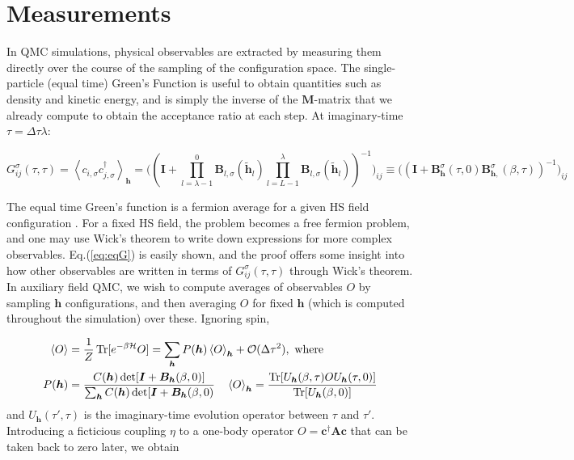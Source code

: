 \section{Measurements}
\label{subsec:measurements}

In QMC simulations, physical observables are extracted by measuring them directly over the course of the sampling of the  configuration space. The single-particle (equal time) Green's Function is useful to obtain quantities such as density and kinetic energy, and is simply the inverse of the $\bm M$-matrix that we already compute to obtain the acceptance ratio at each step.
At imaginary-time $\tau = \Delta \tau \lambda$: 

\begin{equation}\label{eq:eqG}
G_{ij}^\sigma ( \tau, \tau) = \left\langle c_{i,\sigma} c_{j,\sigma}^\dagger \right\rangle_{\bm h} = \bigg( (\bm I + \prod_{l= \lambda - 1}^0 \bm B_{l,\sigma} ( \widetilde{\bm h}_l ) \prod_{l= L -1}^\lambda \bm B_{l,\sigma} ( \widetilde{\bm h}_l )  )^{-1} \bigg)_{ij} \equiv \bigg( (\bm I + \bm B_{\bm h}^\sigma (\tau, 0) \bm B_{\bm h, }^\sigma (\beta, \tau)  )^{-1} \bigg)_{ij}
\end{equation}

The equal time Green's function is a fermion average for a given HS field configuration \cite{santos_introduction_2003}.
For a fixed HS field, the problem becomes a free fermion problem, and one may use Wick's theorem to write down expressions for more complex observables.
Eq.(\ref{eq:eqG}) is easily shown, and the proof offers some insight into how other observables are written in terms of $G_{ij}^\sigma (\tau, \tau)$ through Wick's theorem.
In auxiliary field \ac{QMC}, we wish to compute averages of observables $O$ by sampling $\bm h$ configurations, and then averaging $O$ for fixed $\bm h$ (which is computed throughout the simulation) over these.
Ignoring spin,

\begin{equation}
\begin{split}
\left\langle O \right\rangle &= \frac{1}{Z} \operatorname{Tr} [ e^{-\beta \mathcal{H} } O ] = \sum_{\bm h} P (\bm h) \left\langle O \right\rangle_{\bm h} + \mathcal{O}(\Delta \tau^2 ) , \,\,
\text{where} \\
P ( \bm h ) &= \frac{C(\bm h) \det [ \bm I + \bm B_{\bm h} ( \beta, 0 ) ] }{\sum_{\bm h} C(\bm h) \det [ \bm I + \bm B_{\bm h} ( \beta, 0 )} \quad
\left\langle O \right\rangle_{\bm h} = \frac{\operatorname{Tr}[ U_{\bm h} (\beta, \tau) O U_{\bm h} (\tau, 0)]}{\operatorname{Tr} [ U_{\bm h} (\beta, 0) ] } \\
\end{split}
\end{equation}
and $U_{\bm h} ( \tau', \tau)$ is the imaginary-time evolution operator between $\tau$ and $\tau'$.
Introducing a ficticious coupling $\eta$ to a one-body operator $O = \bm c^\dagger \bm A \bm c$ that can be taken back to zero later, we obtain 

